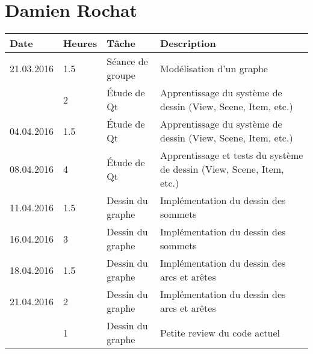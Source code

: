 \documentclass[french]{article}
\begin{document}
	\section*{Damien Rochat}
	\begin{longtable}{p{}|p{}|p{}|p{}}
		Date & Heures & Tâche & Description \\
		\hline \hline
		21.03.2016 & 1.5 & Séance de groupe & Modélisation d'un graphe \\	
		           & 2 & Étude de Qt & Apprentissage du système de dessin (View, Scene, Item, etc.) \\
		\hline
		04.04.2016 & 1.5 & Étude de Qt & Apprentissage du système de dessin (View, Scene, Item, etc.) \\
		\hline
		08.04.2016 & 4 & Étude de Qt & Apprentissage et tests du système de dessin (View, Scene, Item, etc.) \\
		\hline
		11.04.2016 & 1.5 & Dessin du graphe & Implémentation du dessin des sommets \\
		\hline
		16.04.2016 & 3 & Dessin du graphe & Implémentation du dessin des sommets \\
		\hline
		18.04.2016 & 1.5 & Dessin du graphe & Implémentation du dessin des arcs et arêtes \\
		\hline
		21.04.2016 & 2 & Dessin du graphe & Implémentation du dessin des arcs et arêtes \\
		           & 1 & Dessin du graphe & Petite review du code actuel \\


\end{longtable}
\end{document}
